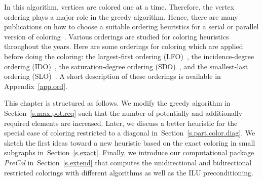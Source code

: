 \documentclass[12pt, twoside,a4paper,toc=bibliography]{scrbook}
\newcommand{\secref}[1]{Section~\protect\ref{#1}}
\newcommand{\appref}[1]{Appendix~\protect\ref{#1}}
\begin{document}
In this algorithm, vertices are colored one at a time.
Therefore, the vertex ordering plays a major role in the greedy algorithm.
Hence, there are many publications on how to choose
a suitable ordering heuristics for a serial or parallel version of
coloring~\cite{ordering1,ordering2,ordering3}.
Various orderings are studied for coloring heuristics
throughout the years. Here are some orderings for coloring which are applied before doing the coloring:
the largest-first ordering (LFO)~\cite{LFO}, the incidence-degree ordering (IDO)~\cite{IDO},
the saturation-degree ordering (SDO)~\cite{SDO}, and the smallest-last ordering (SLO)~\cite{ordering1}.
A short description of these orderings is available in \appref{app.ord}.

This chapter is structured as follows.
We modify the greedy algorithm in \secref{s.max.pot.req}
such that the number of potentially and additionally required elements are increased.
Later, we discuss a better heuristic for
the special case of coloring restricted to a diagonal in~\secref{s.part.color.diag}.
We sketch the first ideas toward a new heuristic based on the exact coloring in small
subgraphs in~\secref{s.exact}.
Finally, we introduce our computational package \textit{PreCol} 
in~\secref{s.extend} that computes the 
unidirectional and bidirectional restricted colorings with different algorithms
as well as the ILU preconditioning. 
\end{document}
